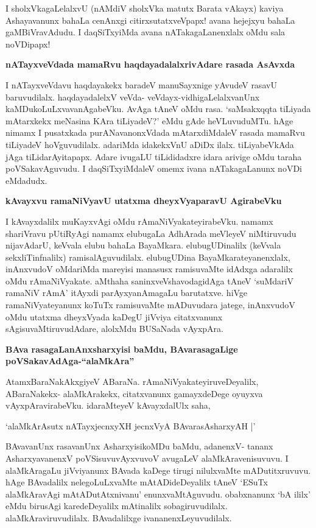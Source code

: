 I sholxVkagaLelalxvU (nAMdiV sholxVka matutx Barata vAkayx) kaviya Ashayavanunx bahaLa cenAnxgi citirxsu\-tatxveVpapx! avana hejejxyu bahaLa gaMBiVravAdudu. I daqSiTxyiMda avana nATakagaLanenxlalx oMdu sala noVDipapx!

{\bigskip
\noindent
{\large\bf nATayxveVdada mamaRvu haqdayadalalxrivAdare rasada AsAvxda}}\label{page244}
\medskip

\noindent
I nATayxveVdavu haqdayakekx baradeV manuSayxnige yAvudeV rasavU baruvudilalx. haqdayadalelxV veVda-\- veVdayx-vidhigaLelalxvanUnx kaMDukoLuLxvavanAgabeVku. AvAga tAneV oMdu rasa. `saMsakxqqta tiLiyada mAtarxkekx meNasina KAra tiLiyadeV?' eMdu gAde heVLuvuduMTu. hAge nimamx I pusatxkada purANava\-nonxVdada mAtarxdiMdaleV rasada mamaRvu tiLiyadeV hoVguvudilalx. adariMda idakekxVnU aDiDx ilalx. tiLiyabeVkAda jAga tiLidarAyitapapx. Adare ivugaLU tiLididadxre idara arivige oMdu taraha poVSaka\-vAguvudu. I daqSiTxyiMdaleV omemx ivana nATakagaLanunx noVDi eMdadudx.


{\bigskip
\noindent
{\large\bf kAvayxvu ramaNiVyavU utatxma dheyxVyaparavU AgirabeVku}}\label{page244}
\medskip

\noindent
I kAvayxdalilx muKayxvAgi oMdu rAmaNiVyakateyirabeVku. namamx shariVravu pUtiR\-yAgi namamx\- elubugaLa AdhArada meVleyeV niMtiruvudu nijavAdarU, keVvala elubu bahaLa BayaMkara. elubu\-gUDinalilx (keVvala sekxliTinfnalilx) ramisalAgu\-vudilalx. elubugUDina BayaMkarateyanenxlalx, inAnx\-vudoV oMdariMda mare\-yisi manasusx ramisuvaMte idAdxga adaralilx oMdu rAmaNiVyakate. aMthaha saninx\-veVshavo\-dagidAga tAneV `suMdariV ramaNiV rAmA' itAyxdi parAyxyanAmagaLu barutatxve. hiVge ramaNiV\-yate\-yanunx koTuTx ramisuvaMte mADuvudara jatege, inAnxvudoV oMdu utatxma dheyxVyada kaDegU jiVviya citatxvanunx sAgisuvaMtiruvudAdare, alolxMdu BUSaNada vAyxpAra.


{\bigskip
\noindent
{\large\bf BAva rasagaLanAnxsharxyisi baMdu, BAvarasagaLige poVSakavAdAga-\break ``alaMkAra''}}\label{page245}
\medskip

\noindent
AtamxBaraNakAkxgiyeV ABaraNa. rAmaNiVyakateyiruveDeyalilx, ABaraNakekx- alaMkArakekx, citatx\-vanunx gamayxdeDege oyuyxva vAyxpAravirabeVku. idaraMteyeV kAvayxdalUlx saha, 

\begin{shloka}
`alaMkArAsutx nATayxjecnxyXH jecnxVyA BAvarasAsharxyAH |'\label{245}
\end{shloka}

BAvavanUnx rasavanUnx AsharxyisikoMDu baMdu, adanenxV- tananx AsharxyavanenxV poVSisuvuvAyx\-vuvoV avugaLeV alaMkAravenisuvuvu. I alaMkAragaLu jiVviyanunx BAvada kaDege tirugi nilulxvaMte mADu\-titxruvuvu. hAge BAvadalilx nelegoLuLxvaMte mAtADideDeyalilx tAneV `ESuTx alaMkAravAgi mAtADu\-tAtxnivanu' enunxvaMtAguvudu. obabxnanunx `bA ililx' eMdu birusAgi karedeDeyalilx mAtinalilx soba\-giru\-vudilalx. alaMkAraviruvudilalx. BAvadalilxge ivananenxLeyuvudilalx.

